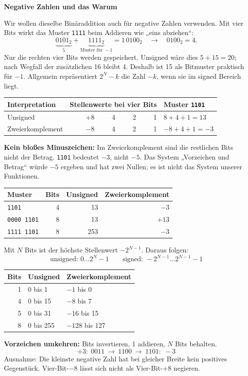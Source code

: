 \documentclass[10pt,a4paper]{article}
\newcommand{\titlepagepart}[2]{\vspace*{-4mm}{\sffamily\small #1}\par{\sffamily\LARGE\bfseries #2}\par\vspace{2mm}}
\newcommand{\block}[1]{\par\vspace{2mm}{\sffamily\large\bfseries #1}\par}
\newcommand{\code}[1]{\texttt{#1}}
\begin{document}
\newpage
\titlepagepart{02 / INTERPRETATION}{Negative Zahlen und das Warum}
\block{Warum Zweierkomplement?}
Wir wollen dieselbe Binäraddition auch für negative Zahlen verwenden.
Mit vier Bits wirkt das Muster \code{1111} beim Addieren wie „eins abziehen“:
\[
\underbrace{0101_2}_{5}+\underbrace{1111_2}_{\text{Muster für }-1}
=1\,0100_2\quad\longrightarrow\quad0100_2=4.
\]
Nur die rechten vier Bits werden gespeichert. Unsigned wäre dies $5+15=20$;
nach Wegfall der zusätzlichen 16 bleibt 4. Deshalb ist 15 als Bitmuster
praktisch für $-1$. Allgemein repräsentiert $2^N-k$ die Zahl $-k$, wenn sie
im signed Bereich liegt.

\block{Die linke Stelle zählt negativ}
\begin{center}
\begin{tabular}{lrrrrl}\toprule
Interpretation&\multicolumn{4}{c}{Stellenwerte bei vier Bits}&Muster \code{1101}\\\midrule
Unsigned&$+8$&4&2&1&$8+4+1=13$\\
Zweierkomplement&$-8$&4&2&1&$-8+4+1=-3$\\\bottomrule
\end{tabular}
\end{center}
\textbf{Kein bloßes Minuszeichen:} Im Zweierkomplement sind die restlichen Bits
nicht der Betrag. \code{1101} bedeutet $-3$, nicht $-5$.
Das System „Vorzeichen und Betrag“ würde $-5$ ergeben und hat zwei Nullen;
es ist nicht das System unserer Funktionen.

\block{Die Bitbreite gehört zur Bedeutung}
\begin{center}
\begin{tabular}{lrrr}\toprule
Muster&Bits&Unsigned&Zweierkomplement\\\midrule
\code{1101}&4&13&$-3$\\
\code{0000 1101}&8&13&$+13$\\
\code{1111 1101}&8&253&$-3$\\\bottomrule
\end{tabular}
\end{center}
Mit $N$ Bits ist der höchste Stellenwert $-2^{N-1}$. Daraus folgen:
\[
\boxed{\text{unsigned: }0\ldots 2^N-1}\qquad
\boxed{\text{signed: }-2^{N-1}\ldots 2^{N-1}-1}
\]
\begin{center}
\begin{tabular}{rll}\toprule
Bits&Unsigned&Zweierkomplement\\\midrule
1&0 bis 1&$-1$ bis 0\\
4&0 bis 15&$-8$ bis 7\\
5&0 bis 31&$-16$ bis 15\\
8&0 bis 255&$-128$ bis 127\\\bottomrule
\end{tabular}
\end{center}
\block{Negieren und Verbreitern}
\textbf{Vorzeichen umkehren:} Bits invertieren, 1 addieren, $N$ Bits behalten.
\[+3:\;0011\ \longrightarrow\ 1100\ \longrightarrow\ 1101:\;-3\]
Ausnahme: Die kleinste negative Zahl hat bei gleicher Breite kein positives
Gegenstück. Vier-Bit-$-8$ lässt sich nicht als Vier-Bit-$+8$ negieren.
\end{document}
